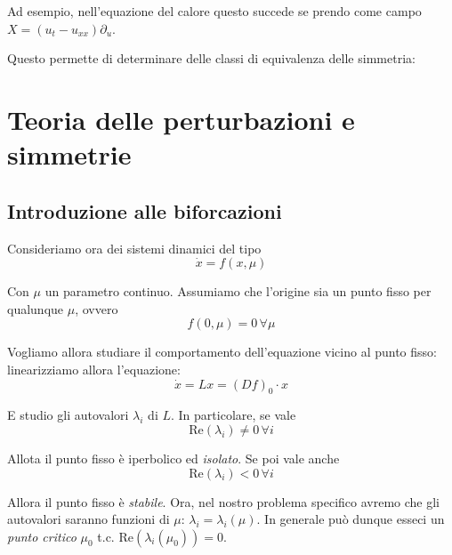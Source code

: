 \documentclass{report}
\begin{document}
Ad esempio, nell'equazione del calore questo succede se prendo come campo $X = (u_t - u_{xx})\partial_u$. 

Questo permette di determinare delle classi di equivalenza delle simmetria: 


\newpage

\chapter{Teoria delle perturbazioni e simmetrie}

\section{Introduzione alle biforcazioni}

Consideriamo ora dei sistemi dinamici del tipo 
\begin{equation}
    \dot{x} = f(x, \mu)
\end{equation}

Con $\mu$ un parametro continuo. Assumiamo che l'origine sia un punto fisso per qualunque $\mu$, ovvero 
\begin{equation}
    f(0, \mu) = 0 \, \forall \mu
\end{equation}

Vogliamo allora studiare il comportamento dell'equazione vicino al punto fisso: linearizziamo allora l'equazione: 
\begin{equation}
    \dot{x} = Lx = (Df)_0 \cdot x
\end{equation}

E studio gli autovalori $\lambda_i$ di $L$. In particolare, se vale 
\begin{equation}
    \text{Re}(\lambda_i) \neq 0 \, \forall i
\end{equation}

Allota il punto fisso è iperbolico ed \emph{isolato}. Se poi vale anche 
\begin{equation}
    \text{Re}(\lambda_i) < 0 \, \forall i
\end{equation}

Allora il punto fisso è \emph{stabile}. Ora, nel nostro problema specifico avremo che gli autovalori saranno funzioni di $\mu$: $\lambda_i = \lambda_i(\mu)$. In generale può dunque esseci un \emph{punto critico} $\mu_0$ t.c. Re$(\lambda_i(\mu_0))=0$. 
\end{document}
